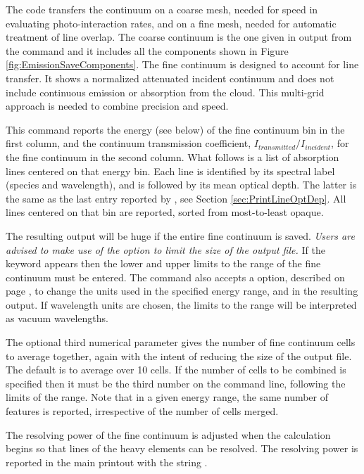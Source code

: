 The code transfers the continuum on a coarse mesh, needed for speed in
evaluating photo-interaction rates, and on a fine mesh, needed for automatic
treatment of line overlap.
The coarse continuum is the one given in output
from the  command and it includes all the components shown in Figure \ref{fig:EmissionSaveComponents}.
The fine continuum is designed to account for line transfer.
It shows a normalized attenuated incident continuum and 
does not include continuous
emission or absorption from the cloud.  
This multi-grid approach is needed to combine precision and speed.

This command reports the energy (see below) of the fine continuum bin in the
first column, and the continuum transmission coefficient,
$I_{transmitted}/I_{incident}$, for the fine continuum in the second column.
What follows is a list of absorption lines centered on that energy bin.
Each line is identified by its spectral label (species and wavelength), and is
followed by its mean optical depth.
The latter is the same as the last entry reported by
, see Section \ref{sec:PrintLineOptDep}.
All lines centered on that bin are reported, sorted from most-to-least opaque.

The resulting output will be huge if the entire fine continuum is saved.
{\it Users are advised to make use of the {\rm{}} option
to limit the size of the output file.}
If the keyword  appears then
the lower and upper limits to the range
of the fine continuum must be entered.
The command also accepts
a  option,
described on page \pageref{output_units}, to change the units used
in the specified energy range, and in the resulting output. If wavelength
units are chosen, the limits to the range will be interpreted as
vacuum wavelengths.

The optional third numerical parameter gives the number
of fine continuum cells to average together, again with the intent of
reducing the size of the output file.  The default is to average over 10
cells.  If the number of cells to be combined is specified then it must
be the third number on the command line, following the limits
of the range.
Note that in a given energy range, the same number of features is reported,
irrespective of the number of cells merged.

The resolving power of the fine continuum is adjusted when the calculation begins so
that lines of the heavy elements can be resolved.
The resolving power is reported in the main printout with the string
.

